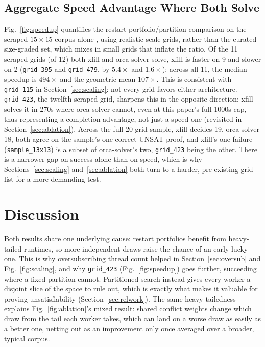 \documentclass[conference]{IEEEtran}
\begin{document}
\subsection{Aggregate Speed Advantage Where Both Solve}
\label{sec:speedup}
Fig.~\ref{fig:speedup} quantifies the restart-portfolio/partition comparison on the scraped $15\times15$ corpus alone \cite{crosswordgrids}, using realistic-scale grids, rather than the curated size-graded set, which mixes in small grids that inflate the ratio. Of the 11 scraped grids (of 12) both xfill and orca-solver solve, xfill is faster on 9 and slower on 2 (\texttt{grid\_395} and \texttt{grid\_479}, by $5.4\times$ and $1.6\times$); across all 11, the median speedup is $494\times$ and the geometric mean $107\times$. This is consistent with \texttt{grid\_115} in Section~\ref{sec:scaling}: not every grid favors either architecture. \texttt{grid\_423}, the twelfth scraped grid, sharpens this in the opposite direction: xfill solves it in 270s where orca-solver cannot, even at this paper's full 1000s cap, thus representing a completion advantage, not just a speed one (revisited in Section~\ref{sec:ablation}). Across the full 20-grid sample, xfill decides 19, orca-solver 18, both agree on the sample's one correct UNSAT proof, and xfill's one failure (\texttt{sample\_13x13}) is a subset of orca-solver's two, \texttt{grid\_423} being the other. There is a narrower gap on success alone than on speed, which is why Sections~\ref{sec:scaling} and~\ref{sec:ablation} both turn to a harder, pre-existing grid list for a more demanding test.

\section{Discussion}

Both results share one underlying cause: restart portfolios benefit from heavy-tailed runtimes, so more independent draws raise the chance of an early lucky one. This is why oversubscribing thread count helped in Section~\ref{sec:oversub} and Fig.~\ref{fig:scaling}, and why \texttt{grid\_423} (Fig.~\ref{fig:speedup}) goes further, succeeding where a fixed partition cannot. Partitioned search instead gives every worker a disjoint slice of the space to rule out, which is exactly what makes it valuable for proving unsatisfiability (Section~\ref{sec:relwork}). The same heavy-tailedness explains Fig.~\ref{fig:ablation}'s mixed result: shared conflict weights change which draw from the tail each worker takes, which can land on a worse draw as easily as a better one, netting out as an improvement only once averaged over a broader, typical corpus.
\end{document}
